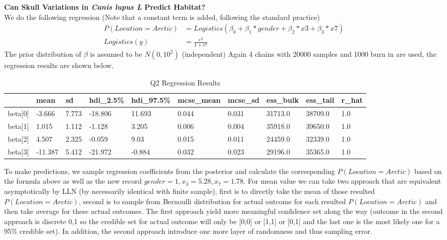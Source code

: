 \documentclass{homeworg}
\begin{document}
\exercise 
\textbf{Can Skull Variations in \emph{Canis lupus L} Predict Habitat?} \\
We do the following regression (Note that a constant term is added, following the standard practice)
\begin{align*}
P(Location=Arctic)&=Logistics(\beta_0+\beta_1*gender+\beta_2*x3+\beta_3*x7)\\
Logistics(y)&=\frac{e^y}{1+e^y}
\end{align*}
The prior distribution of $\beta$ is assumed to be $N(0,10^2)$ (independent) Again 4 chains with 20000 samples and 1000 burn in are used, the regression results are shown below. 

\begin{table}[h]
	\caption{Q2 Regression Results}
	\begin{tabular}{llllllllll}
		\hline \hline 
		& mean    & sd    & hdi\_2.5\% & hdi\_97.5\% & mcse\_mean & mcse\_sd & ess\_bulk & ess\_tail & r\_hat \\ \hline 
		beta{[}0{]} & -3.666  & 7.773 & -18.806    & 11.693      & 0.044      & 0.031    & 31713.0   & 38709.0   & 1.0    \\
		beta{[}1{]} & 1.015   & 1.112 & -1.128     & 3.205       & 0.006      & 0.004    & 35918.0   & 39650.0   & 1.0    \\
		beta{[}2{]} & 4.507   & 2.325 & -0.059     & 9.03        & 0.015      & 0.011    & 24459.0   & 32339.0   & 1.0    \\
		beta{[}3{]} & -11.387 & 5.412 & -21.972    & -0.884      & 0.032      & 0.023    & 29196.0   & 35365.0   & 1.0   \\ \hline \hline
	\end{tabular}
\end{table}

To make predictions, we sample regression coefficients from the posterior and calculate the corresponding $P(Location=Arctic)$ based on the formula above as well as the new record $gender=1, x_3 = 5.28, x_7 = 1.78$. For mean value we can take two approach that are equivalent asymptotically by LLN (by necessarily identical with finite sample), first is to directly take the mean of those resulted $P(Location=Arctic)$, second is to sample from Bernoulli distribution for actual outcome for each resulted $P(Location=Arctic)$  and then take average for these actual outcomes. The first approach yield more meaningful confidence set along the way (outcome in the second approach is discrete 0,1 so the credible set for actual outcome will only be [0,0] or [1,1] or [0,1] and the last one is the most likely one for a 95\% credible set). In addition, the second approach introduce one more layer of randomness and thus sampling error.  
\end{document}
